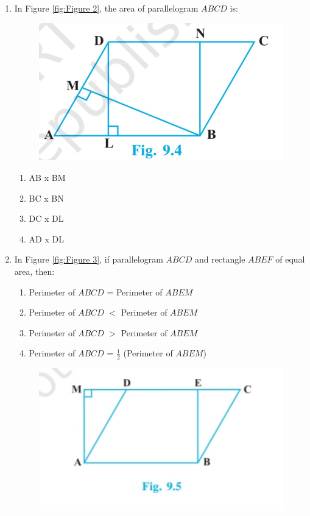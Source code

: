 \documentclass{article}
\begin{document}
\begin{enumerate}
\item In Figure \eqref{fig:Figure 2}, the area of parallelogram $ABCD$ is:
\begin{figure}[!h]
\begin{center}
\includegraphics[width=\columnwidth]{four.jpg}
\caption{}
\label{fig:Figure 2}
\end{center}
\end{figure}
\begin{enumerate}
\item AB x BM
\item BC x BN
\item DC x DL
\item AD x DL
\end{enumerate}
\item In Figure \eqref{fig:Figure 3}, if parallelogram $ABCD$ and rectangle $ABEF$ of equal area, then:
\begin{enumerate}
\item Perimeter of $ABCD$ = Perimeter of $ABEM$
\item Perimeter of $ABCD$ $<$ Perimeter of $ABEM$
\item Perimeter of $ABCD$ $>$ Perimeter of $ABEM$
\item Perimeter of $ABCD$ = $\frac{1}{2}$ (Perimeter of $ABEM$)
\end{enumerate}
\begin{figure}[!h]
\begin{center}
\includegraphics[width=\columnwidth]{five.jpg}

\end{center}
\end{figure}
\end{enumerate}
\end{document}
